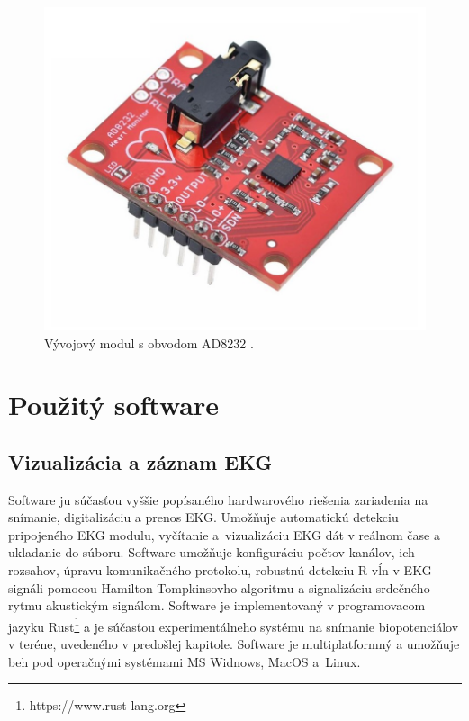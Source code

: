 \begin{figure}[H]
    \centering
    \includegraphics[scale=0.24]{img/AD8232.jpg}
    \caption{Vývojový modul s obvodom AD8232 \cite{Sharvielectronics_2022}.}
    \label{fig:HW}
\end{figure}


\section{Použitý software}

\subsection{Vizualizácia a záznam EKG}

Software ju súčasťou vyššie popísaného hardwarového riešenia zariadenia na snímanie, digitalizáciu a prenos EKG. Umožňuje automatickú detekciu pripojeného EKG modulu, vyčítanie a~vizualizáciu EKG dát v reálnom čase a ukladanie do súboru. Software umožňuje konfiguráciu počtov kanálov, ich rozsahov, úpravu komunikačného protokolu, robustnú detekciu R-vĺn v EKG signáli pomocou Hamilton-Tompkinsovho algoritmu a signalizáciu srdečného rytmu akustickým signálom. Software je implementovaný v programovacom jazyku Rust\footnote{https://www.rust-lang.org} a je súčasťou experimentálneho systému na snímanie biopotenciálov v teréne, uvedeného v predošlej kapitole. Software je multiplatformný a umožňuje beh pod operačnými systémami MS Widnows, MacOS a~Linux.

